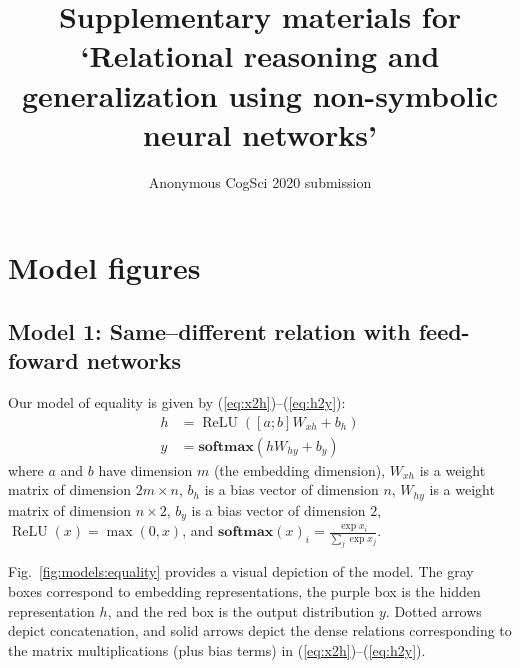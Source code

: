 \documentclass[12pt]{article}
\title{Supplementary materials for `Relational reasoning and generalization using non-symbolic neural networks'}
\author{Anonymous CogSci 2020 submission}
\date{}
\newcommand{\softmax}{\mathbf{softmax}}
\DeclareMathOperator{\ReLU}{ReLU}
\newcommand{\Figref}[1]{Fig.~\ref{#1}}
\newcommand{\eg}[1]{(\ref{#1})}
\newcommand{\dasheg}[2]{\eg{#1}--\eg{#2}}
\begin{document}
\maketitle

\tableofcontents

\newpage



\section{Model figures}



\subsection{Model 1: Same--different relation with feed-foward  networks}\label{sec:model1}

Our model of equality is given by \dasheg{eq:x2h}{eq:h2y}:
%
\begin{align}
  h &= \ReLU([a;b]W_{xh} + b_{h}) \label{eq:x2h}\\
  y &= \softmax(hW_{hy} + b_{y}) \label{eq:h2y}
\end{align}
%
where $a$ and $b$ have dimension $m$ (the embedding dimension), $W_{xh}$ is a weight matrix of dimension $2m \times n$, $b_{h}$ is a bias vector of dimension $n$, $W_{hy}$ is a weight matrix of dimension $n \times 2$, $b_{y}$ is a bias vector of dimension $2$, $\ReLU(x) = \max(0, x)$, and $\softmax(x)_{i} = \frac{\exp{x_{i}}}{\sum_{j} \exp{x_{j}}}$.

\Figref{fig:models:equality} provides a visual depiction of the model. The gray boxes correspond to embedding representations, the purple box is the hidden representation $h$, and the red box is the output distribution $y$. Dotted arrows depict concatenation, and solid arrows depict the dense relations corresponding to the matrix multiplications (plus bias terms) in \dasheg{eq:x2h}{eq:h2y}.
\end{document}
